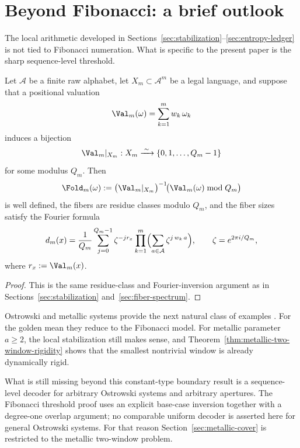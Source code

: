 \section{Beyond Fibonacci: a brief outlook}\label{sec:generalization}

The local arithmetic developed in Sections~\ref{sec:stabilization}--\ref{sec:entropy-ledger} is not tied to Fibonacci numeration. What is specific to the present paper is the sharp sequence-level threshold.

\begin{proposition}\label{prop:gen-fiber}
Let $\mathcal A$ be a finite raw alphabet, let $X_m\subset \mathcal A^m$ be a legal language, and suppose that a positional valuation
\[
\Val_m(\omega)=\sum_{k=1}^m w_k\,\omega_k
\]
induces a bijection
\[
\Val_m|_{X_m}:X_m\xrightarrow{\;\sim\;}\{0,1,\ldots,Q_m-1\}
\]
for some modulus $Q_m$. Then
\[
\Fold_m(\omega):=\bigl(\Val_m|_{X_m}\bigr)^{-1}\!\bigl(\Val_m(\omega)\bmod Q_m\bigr)
\]
is well defined, the fibers are residue classes modulo $Q_m$, and the fiber sizes satisfy the Fourier formula
\begin{equation}\label{eq:gen-dft}
d_m(x)=\frac{1}{Q_m}\sum_{j=0}^{Q_m-1}\zeta^{-jr_x}
\prod_{k=1}^m\Bigl(\sum_{a\in\mathcal A}\zeta^{j\,w_k\,a}\Bigr),
\qquad
\zeta=e^{2\pi i/Q_m},
\end{equation}
where $r_x:=\Val_m(x)$.
\end{proposition}

\begin{proof}
This is the same residue-class and Fourier-inversion argument as in Sections~\ref{sec:stabilization} and~\ref{sec:fiber-spectrum}.
\end{proof}

Ostrowski and metallic systems provide the next natural class of examples \cite{Ostrowski1922,Berthe2001Ostrowski,AlloucheShallit2003}. For the golden mean they reduce to the Fibonacci model. For metallic parameter $a\ge2$, the local stabilization still makes sense, and Theorem~\ref{thm:metallic-two-window-rigidity} shows that the smallest nontrivial window is already dynamically rigid.

What is still missing beyond this constant-type boundary result is a sequence-level decoder for arbitrary Ostrowski systems and arbitrary apertures. The Fibonacci threshold proof uses an explicit base-case inversion together with a degree-one overlap argument; no comparable uniform decoder is asserted here for general Ostrowski systems. For that reason Section~\ref{sec:metallic-cover} is restricted to the metallic two-window problem.
